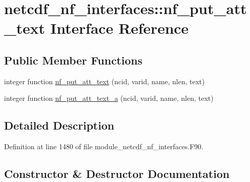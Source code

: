\hypertarget{interfacenetcdf__nf__interfaces_1_1nf__put__att__text}{}\section{netcdf\+\_\+nf\+\_\+interfaces\+:\+:nf\+\_\+put\+\_\+att\+\_\+text Interface Reference}
\label{interfacenetcdf__nf__interfaces_1_1nf__put__att__text}
\subsection*{Public Member Functions}
\begin{DoxyCompactItemize}
\item 
integer function \hyperlink{interfacenetcdf__nf__interfaces_1_1nf__put__att__text_acd74fdc0793fae8ebd5e057768bcfc93}{nf\+\_\+put\+\_\+att\+\_\+text} (ncid, varid, name, nlen, text)
\item 
integer function \hyperlink{interfacenetcdf__nf__interfaces_1_1nf__put__att__text_a22fb68c628bc4e70b10375d2f5462521}{nf\+\_\+put\+\_\+att\+\_\+text\+\_\+a} (ncid, varid, name, nlen, text)
\end{DoxyCompactItemize}


\subsection{Detailed Description}


Definition at line 1480 of file module\+\_\+netcdf\+\_\+nf\+\_\+interfaces.\+F90.



\subsection{Constructor \& Destructor Documentation}
\mbox{\label{interfacenetcdf__nf__interfaces_1_1nf__put__att__text_acd74fdc0793fae8ebd5e057768bcfc93}} 

